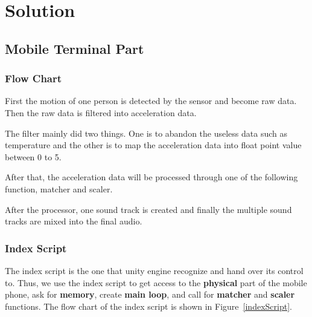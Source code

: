\section{Solution}

\subsection{Mobile Terminal Part}

\subsubsection{Flow Chart}

\hspace*{2em}First the motion of one person is detected by the sensor and become raw data.
   Then the raw data is filtered into acceleration data. 

   The filter mainly did two things.
   One is to abandon the useless data such as temperature and the other is to
   map the acceleration data into float point value between 0 to 5. 

   After that, the acceleration data will be processed through one of the
   following function, matcher and scaler. 

   After the processor, one sound track is created and finally the multiple
   sound tracks are mixed into the final audio. 

\subsubsection{Index Script}

The index script is the one that unity engine recognize and hand over its
control to. 
Thus, we use the index script to get access to the \textbf{physical} part of the
mobile phone, ask for \textbf{memory}, create \textbf{main loop}, and call for
\textbf{matcher} and \textbf{scaler} functions.
The flow chart of the index script is shown in Figure~\ref{indexScript}.

